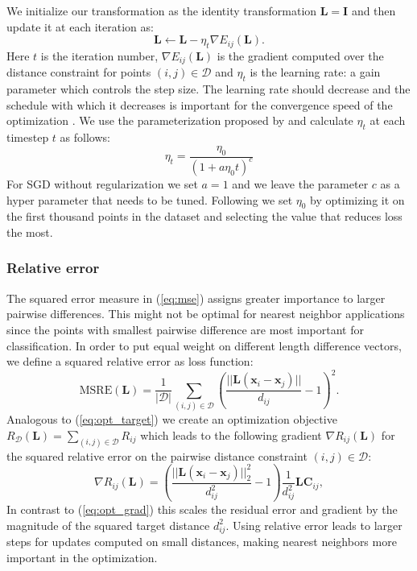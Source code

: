 \documentclass[a4paper,titlepage]{article}
\renewcommand{\vec}[1]{\mathbf{#1}}
\newcommand{\mat}[1]{\mathbf{#1}}
\begin{document}
We initialize our transformation as the identity transformation $\mat{L} = \mat{I}$ and then update it at each iteration as:
\begin{equation}
\mat{L} \leftarrow \mat{L} - \eta_{t} \nabla E_{ij}(\mat{L}).
\label{eq:update}
\end{equation}
Here $t$ is the iteration number, $\nabla E_{ij}(\mat{L})$ is the gradient computed over the distance constraint for points $(i,j) \in \mathcal{D}$ and $\eta_{t}$ is the learning rate: a gain parameter which controls the step size. The learning rate should decrease and the schedule with which it decreases is important for the convergence speed of the optimization \cite{xu2011towards}. We use the parameterization proposed by \cite{xu2011towards} and calculate $\eta_{t}$ at each timestep $t$ as follows:
\begin{equation}
\eta_{t} = \frac{\eta_0}{\left(1+ a \eta_0 t \right)^c}
\label{eq:eta_update}
\end{equation}
For SGD without regularization we set $a = 1$ and we leave the parameter $c$ as a hyper parameter that needs to be tuned. Following \cite{bottou2008tradeoffs} we set $\eta_0$ by optimizing it on the first thousand points in the dataset and selecting the value that reduces loss the most.

\subsubsection{Relative error}

The squared error measure in (\ref{eq:mse}) assigns greater importance to larger pairwise differences. This might not be optimal for nearest neighbor applications since the points with smallest pairwise difference are most important for classification.  In order to put equal weight on different length difference vectors, we define a squared relative error as loss function:
\begin{equation}
\text{MSRE}(\mat{L}) = \frac{1}{|\mathcal{D}|}\sum_{(i,j) \in \mathcal{D}} \left ( \frac{||\mat{L} (\vec{x}_i - \vec{x}_j)||}{d_{ij}} - 1 \right)^2.
\label{eq:msre}
\end{equation}
Analogous to (\ref{eq:opt_target}) we create an optimization objective $R_{\mathcal{D}}(\mat{L}) = \sum_{(i,j) \in \mathcal{D}} R_{ij}$ which leads to the following gradient $\nabla R_{ij}(\mat{L})$ for the squared relative error on the pairwise distance constraint $(i,j) \in \mathcal{D}$:
\begin{equation}
\nabla R_{ij}(\mat{L})  =  \left ( \frac{||\mat{L}(\vec{x}_i - \vec{x}_j)||_2^2}{d_{ij}^2} - 1 \right) \frac{1}{d_{ij}^2} \mat{L} \mat{C}_{ij},
\label{eq:relative_grad}
\end{equation}
In contrast to (\ref{eq:opt_grad}) this scales the residual error and gradient by the magnitude of the squared target distance $d_{ij}^2$. Using relative error leads to larger steps for updates computed on small distances, making nearest neighbors more important in the optimization.
\end{document}
